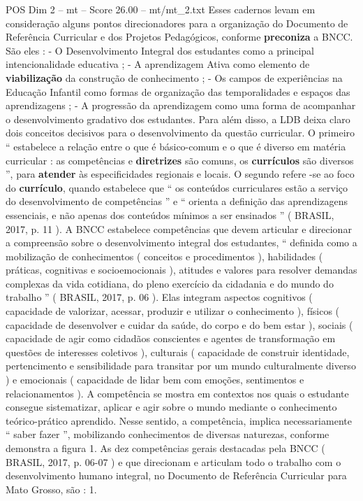 \begin{textsample}{POS Dim 2 – mt – Score 26.00 – mt/mt\_2.txt}
Esses cadernos levam em consideração alguns pontos direcionadores para a organização do Documento de Referência Curricular e dos Projetos Pedagógicos, conforme \textbf{preconiza} a BNCC.
São eles : - O Desenvolvimento Integral dos estudantes como a principal intencionalidade educativa ; - A aprendizagem Ativa como elemento de \textbf{viabilização} da construção de conhecimento ; - Os campos de experiências na Educação Infantil como formas de organização das temporalidades e espaços das aprendizagens ; - A progressão da aprendizagem como uma forma de acompanhar o desenvolvimento gradativo dos estudantes.
Para além disso, a LDB deixa claro dois conceitos decisivos para o desenvolvimento da questão curricular.
O primeiro “ estabelece a relação entre o que é básico-comum e o que é diverso em matéria curricular : as competências e \textbf{diretrizes} são comuns, os \textbf{currículos} são diversos ”, para \textbf{atender} às especificidades regionais e locais.
O segundo refere -se ao foco do \textbf{currículo}, quando estabelece que “ os conteúdos curriculares estão a serviço do desenvolvimento de competências ” e “ orienta a definição das aprendizagens essenciais, e não apenas dos conteúdos mínimos a ser ensinados ” ( BRASIL, 2017, p. 11 ).
A BNCC estabelece competências que devem articular e direcionar a compreensão sobre o desenvolvimento integral dos estudantes, “ definida como a mobilização de conhecimentos ( conceitos e procedimentos ), habilidades ( práticas, cognitivas e socioemocionais ), atitudes e valores para resolver demandas complexas da vida cotidiana, do pleno exercício da cidadania e do mundo do trabalho ” ( BRASIL, 2017, p. 06 ).
Elas integram aspectos cognitivos ( capacidade de valorizar, acessar, produzir e utilizar o conhecimento ), físicos ( capacidade de desenvolver e cuidar da saúde, do corpo e do bem estar ), sociais ( capacidade de agir como cidadãos conscientes e agentes de transformação em questões de interesses coletivos ), culturais ( capacidade de construir identidade, pertencimento e sensibilidade para transitar por um mundo culturalmente diverso ) e emocionais ( capacidade de lidar bem com emoções, sentimentos e relacionamentos ).
A competência se mostra em contextos nos quais o estudante consegue sistematizar, aplicar e agir sobre o mundo mediante o conhecimento teórico-prático aprendido.
Nesse sentido, a competência, implica necessariamente “ saber fazer ”, mobilizando conhecimentos de diversas naturezas, conforme demonstra a figura 1.
As dez competências gerais destacadas pela BNCC ( BRASIL, 2017, p. 06-07 ) e que direcionam e articulam todo o trabalho com o desenvolvimento humano integral, no Documento de Referência Curricular para Mato Grosso, são : 1.

\end{textsample}

